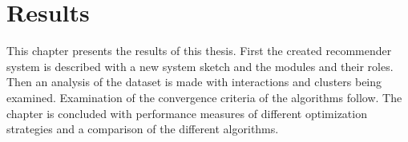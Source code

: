 \chapter{Results}\label{cha:Results}


This chapter presents the results of this thesis. First the created recommender system is described with a new system sketch and the modules and their roles. Then an analysis of the dataset is made with interactions and clusters being examined. Examination of the convergence criteria of the algorithms follow.  The chapter is concluded with performance measures of different optimization strategies and a comparison of the different algorithms.


\newpage


\newpage


\newpage


\newpage


\newpage


\newpage


\newpage

